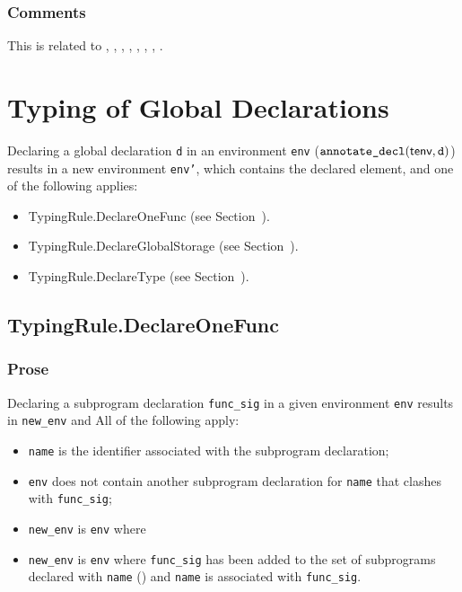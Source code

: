 \documentclass{book}
\newcommand\declaredecl[1]{\texttt{annotate\_decl}(#1)}
\begin{document}
\subsection{Comments}
This is related to , , , ,
, , , .

\chapter{Typing of Global Declarations}

Declaring a global declaration \texttt{d} in an environment \texttt{env} ($\declaredecl{\tenv, \texttt{d}}$)
results in a new environment \texttt{env'}, which contains the declared element, and one of the following applies:
\begin{itemize}
  \item TypingRule.DeclareOneFunc (see Section~).
  \item TypingRule.DeclareGlobalStorage (see Section~).
  \item TypingRule.DeclareType (see Section~).
\end{itemize}

\section{TypingRule.DeclareOneFunc \label{sec:TypingRule.DeclareOneFunc}}
\subsection{Prose}
Declaring a subprogram declaration \texttt{func\_sig} in a given environment \texttt{env} results
in \texttt{new\_env} and All of the following apply:
\begin{itemize}
  \item \texttt{name} is the identifier associated with the subprogram declaration;
  \item \texttt{env} does not contain another subprogram declaration for \texttt{name} that clashes with \texttt{func\_sig};
  \item \texttt{new\_env} is \texttt{env} where
  \item \texttt{new\_env} is \texttt{env} where
  \texttt{func\_sig} has been added to the set of subprograms declared with \texttt{name} (\subprogramrenamings)
  and \texttt{name} is associated with \texttt{func\_sig}.
\end{itemize}
\end{document}
